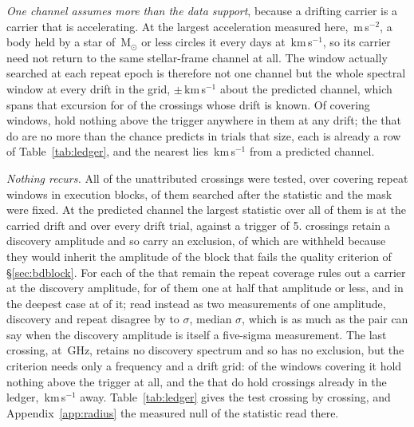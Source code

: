 \emph{One channel assumes more than the data support}, because a drifting
carrier is a carrier that is accelerating. At the largest acceleration
measured here, \WdAlosMax\,m\,s$^{-2}$, a body held by a star of
\WdMassMax\,M$_\odot$ or less circles it every \WdOrbDay{} days at
\WdOrbKms\,km\,s$^{-1}$, so its carrier need not return to the same
stellar-frame channel at all. The window actually searched at each repeat
epoch is therefore not one channel but the whole spectral window at every
drift in the grid, $\pm$\WdHalfKms\,km\,s$^{-1}$ about the predicted channel,
which spans that excursion for \WdNOrbSpan{} of the \RcNExclPoss{} crossings
whose drift is known. Of \WdNCov{} covering windows, \WdNEmpty{} hold nothing
above the trigger anywhere in them at any drift; the \WdNExc{} that do are no
more than the \WdExpect{} chance predicts in trials that size, each is already
a row of Table~\ref{tab:ledger}, and the nearest lies
\WdNearKms\,km\,s$^{-1}$ from a predicted channel.

\emph{Nothing recurs.} All \RcNTested{} of the \NUnattributed{} unattributed
crossings were tested, over \RcNRepeatMeas{} covering repeat windows in
\RcNRepeatBlock{} execution blocks, \RcNRepeatFollow{} of them searched after
the statistic and the mask were fixed. At the predicted channel the largest
statistic over all of them is \RcTRepMax{} at the carried drift and \RcTMax{}
over every drift trial, against a trigger of 5. \RcNExclPoss{} crossings
retain a discovery amplitude and so carry an exclusion, \RcNWithheld{} of
which are withheld because they would inherit the amplitude of the block that
fails the quality criterion of \S\ref{sec:bdblock}. For each of the
\RcNExcl{} that remain the repeat coverage rules out a carrier at the
discovery amplitude, for \RcNFracHalf{} of them one at half that amplitude or
less, and in the deepest case at \RcFracMin{} of it; read instead as two
measurements of one amplitude, discovery and repeat disagree by \RcExclMin{}
to \RcExclMax$\sigma$, median \RcExclMed$\sigma$, which is as much as the pair
can say when the discovery amplitude is itself a five-sigma measurement. The
last crossing, \RcUntStar{} at \RcUntFreq\,GHz, retains no discovery spectrum
and so has no exclusion, but the criterion needs only a frequency and a drift
grid: \CtCritNEmpty{} of the \CtCritNCov{} windows covering it hold nothing
above the trigger at all, and the \CtCritNExc{} that do hold crossings already
in the ledger, \CtCritNearKms\,km\,s$^{-1}$ away.
Table~\ref{tab:ledger} gives the test crossing by crossing, and
Appendix~\ref{app:radius} the measured null of the statistic read there.

